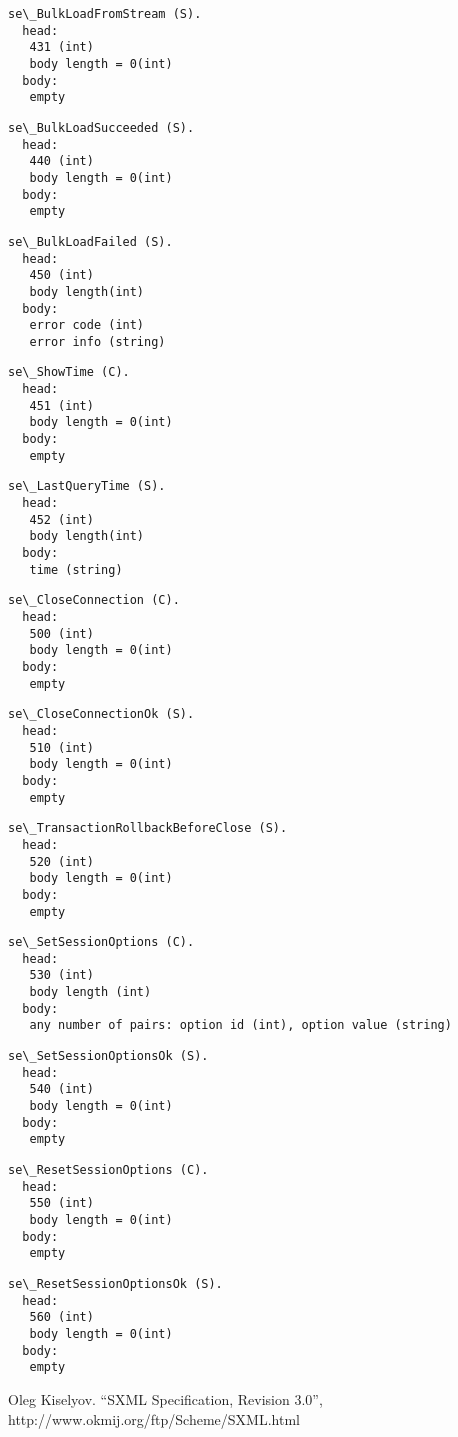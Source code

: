 \documentclass[a4paper,12pt]{article}
\begin{document}
\begin{verbatim}
se\_BulkLoadFromStream (S).
  head:
   431 (int)
   body length = 0(int)
  body:
   empty
\end{verbatim}

\begin{verbatim}
se\_BulkLoadSucceeded (S).
  head:
   440 (int)
   body length = 0(int)
  body:
   empty
\end{verbatim}

\begin{verbatim}
se\_BulkLoadFailed (S).
  head:
   450 (int)
   body length(int)
  body:
   error code (int)
   error info (string)
\end{verbatim}

\begin{verbatim}
se\_ShowTime (C).
  head:
   451 (int)
   body length = 0(int)
  body:
   empty
\end{verbatim}

\begin{verbatim}
se\_LastQueryTime (S).
  head:
   452 (int)
   body length(int)
  body:
   time (string)
\end{verbatim}

\begin{verbatim}
se\_CloseConnection (C).
  head:
   500 (int)
   body length = 0(int)
  body:
   empty
\end{verbatim}

\begin{verbatim}
se\_CloseConnectionOk (S).
  head:
   510 (int)
   body length = 0(int)
  body:
   empty
\end{verbatim}

\begin{verbatim}
se\_TransactionRollbackBeforeClose (S).
  head:
   520 (int)
   body length = 0(int)
  body:
   empty
\end{verbatim}

\begin{verbatim}
se\_SetSessionOptions (C).
  head:
   530 (int)
   body length (int)
  body:
   any number of pairs: option id (int), option value (string)
\end{verbatim}

\begin{verbatim}
se\_SetSessionOptionsOk (S).
  head:
   540 (int)
   body length = 0(int)
  body:
   empty
\end{verbatim}

\begin{verbatim}
se\_ResetSessionOptions (C).
  head:
   550 (int)
   body length = 0(int)
  body:
   empty
\end{verbatim}

\begin{verbatim}
se\_ResetSessionOptionsOk (S).
  head:
   560 (int)
   body length = 0(int)
  body:
   empty
\end{verbatim}

\begin{thebibliography}{1}

Oleg Kiselyov.
``SXML Specification, Revision 3.0'',
http://www.okmij.org/ftp/Scheme/SXML.html
\end{thebibliography}
\end{document}
